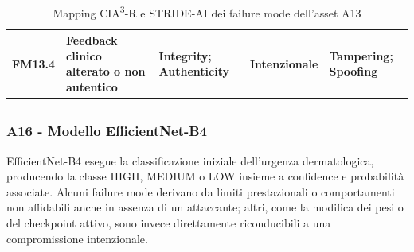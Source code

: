 {\begin{xltabular}{\textwidth}{
    >{\raggedright\arraybackslash}p{1.35cm}
    X
    >{\raggedright\arraybackslash}p{3.5cm}
    >{\raggedright\arraybackslash}p{2.7cm}
    >{\raggedright\arraybackslash}p{2.4cm}
}
\midrule


FM13.4 &

Feedback clinico alterato o non autentico &

Integrity; Authenticity &

Intenzionale &

Tampering; Spoofing \\

\bottomrule

\caption{Mapping CIA\textsuperscript{3}-R e STRIDE-AI dei failure mode dell'asset A13}

\label{tab:a13-stride}\\

\end{xltabular}
}


\subsubsection{A16 - Modello EfficientNet-B4}

EfficientNet-B4 esegue la classificazione iniziale dell'urgenza dermatologica, producendo la classe HIGH, MEDIUM o LOW insieme a confidence e probabilità associate. Alcuni failure mode derivano da limiti prestazionali o comportamenti non affidabili anche in assenza di un attaccante; altri, come la modifica dei pesi o del checkpoint attivo, sono invece direttamente riconducibili a una compromissione intenzionale.






